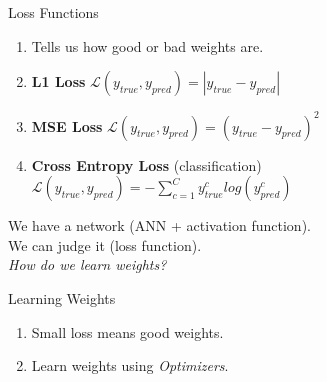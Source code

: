 \documentclass[handout]{beamer}
\begin{document}
\begin{frame}{Loss Functions}
\begin{enumerate}
  \item Tells us how good or bad weights are. \\

  \item \textbf{L1 Loss} $\mathcal{L}(y_{true},y_{pred}) = |y_{true}-y_{pred}|$ \\

  \item \textbf{MSE Loss} $\mathcal{L}(y_{true},y_{pred}) = (y_{true}-y_{pred})^2$ \\

  \item \textbf{Cross Entropy Loss} (classification) $\mathcal{L}(y_{true},y_{pred}) = -\sum_{c=1}^{C}y^c_{true}log(y^c_{pred})$ \\
\end{enumerate}
\end{frame}

\begin{frame}{}
    \center
    \Large{\color{blue}We have a network (ANN + activation function). \\
    We can judge it (loss function). \\
    \textit{How do we learn weights?}}
\end{frame}

\begin{frame}{Learning Weights}
  \begin{enumerate}
    \item Small loss means good weights.
    \item Learn weights using \textit{Optimizers}.
  \end{enumerate}
\end{frame}

\end{document}
